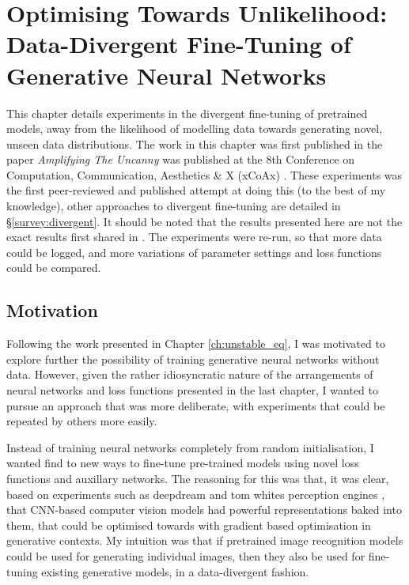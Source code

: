 \chapter{Optimising Towards Unlikelihood: Data-Divergent Fine-Tuning of Generative Neural Networks}
\label{ch:divergent}

This chapter details experiments in the divergent fine-tuning of pretrained models, away from the likelihood of modelling data towards generating novel, unseen data distributions. 
The work in this chapter was first published in the paper \textit{Amplifying The Uncanny} was published at the 8th Conference on Computation, Communication, Aesthetics \& X (xCoAx) \citep{broad2020amplifying}. 
These experiments was the first peer-reviewed and published attempt at doing this (to the best of my knowledge), other approaches to divergent fine-tuning are detailed in \S \ref{survey:divergent}. 
It should be noted that the results presented here are not the exact results first shared in \cite{broad2020amplifying}. The experiments were re-run, so that more data could be logged, and more variations of parameter settings and loss functions could be compared.

\section{Motivation}
\label{c4:sec:motivation}

Following the work presented in Chapter \ref{ch:unstable_eq}, I was motivated to explore further the possibility of training generative neural networks without data. 
However, given the rather idiosyncratic nature of the arrangements of neural networks and loss functions presented in the last chapter, I wanted to pursue an approach that was more deliberate, with experiments that could be repeated by others more easily. 

Instead of training neural networks completely from random initialisation, I wanted find to new ways to fine-tune pre-trained models using novel loss functions and auxillary networks. 
The reasoning for this was that, it was clear, based on experiments such as deepdream \citep{mordvintsev2015inceptionism} and tom whites perception engines \citep{white2018perception,white2019shared}, that CNN-based computer vision models had powerful representations baked into them, that could be optimised towards with gradient based optimisation in generative contexts.
My intuition was that if pretrained image recognition models could be used for generating individual images, then they also be used for fine-tuning existing generative models, in a data-divergent fashion.


